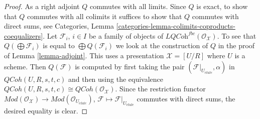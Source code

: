 \documentclass[10pt,a4paper]{amsart}
\theoremstyle{plain}
\theoremstyle{definition}
\theoremstyle{remark}
\numberwithin{equation}{subsection}
\def\etale{{\acute{e}tale}}
\def\QCoh{\mathit{QCoh}}
\begin{document}
\begin{proof}
\medskip\noindent
As a right adjoint $Q$ commutes with all limits. Since $Q$ is exact, to
show that $Q$ commutes with all colimits it suffices to show that $Q$
commutes with direct sums, see
Categories, Lemma \ref{categories-lemma-colimits-coproducts-coequalizers}.
Let $\mathcal{F}_i$, $i \in I$ be a family of objects of
$\textit{LQCoh}^{fbc}(\mathcal{O}_\mathcal{X})$. To see that
$Q(\bigoplus \mathcal{F}_i)$ is equal to $\bigoplus Q(\mathcal{F}_i)$
we look at the construction of $Q$ in the proof of
Lemma \ref{lemma-adjoint}. This uses a presentation $\mathcal{X} = [U/R]$
where $U$ is a scheme. Then $Q(\mathcal{F})$
is computed by first taking the pair
$(\mathcal{F}|_{U_\etale}, \alpha)$ in $\QCoh(U, R, s, t, c)$
and then using the equivalence
$\QCoh(U, R, s, t, c) \cong \QCoh(\mathcal{O}_\mathcal{X})$.
Since the restriction functor $\textit{Mod}(\mathcal{O}_\mathcal{X}) \to
\textit{Mod}(\mathcal{O}_{U_\etale})$,
$\mathcal{F} \mapsto \mathcal{F}|_{U_\etale}$ commutes with
direct sums, the desired equality is clear.
\end{proof}
\end{document}
